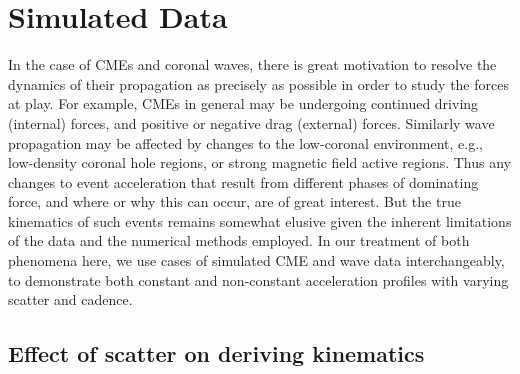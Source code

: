 \documentclass[structabstract]{aa}
\begin{document}
\section{Simulated Data}
\label{sect:simul1}

In the case of CMEs and coronal waves, there is great motivation to resolve the dynamics of their propagation as precisely as possible in order to study the forces at play. For example, CMEs in general may be undergoing continued driving (internal) forces, and positive or negative drag (external) forces. Similarly wave propagation may be affected by changes to the low-coronal environment, e.g., low-density coronal hole regions, or strong magnetic field active regions. Thus any changes to event acceleration that result from different phases of dominating force, and where or why this can occur, are of great interest. But the true kinematics of such events remains somewhat elusive given the inherent limitations of the data and the numerical methods employed. In our treatment of both phenomena here, we use cases of simulated CME and wave data interchangeably, to demonstrate both constant and non-constant acceleration profiles with varying scatter and cadence.


\subsection{Effect of scatter on deriving kinematics}
\label{subsect:noise}
\end{document}
